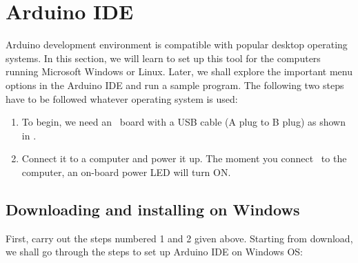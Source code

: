 
\section{Arduino IDE}\label{arduino-ide}
\label{sec:ard-start}
Arduino development environment is compatible with popular desktop
operating systems. In this section, we will learn to set up this tool
for the computers running Microsoft Windows or Linux. Later, we shall
explore the important menu options in the Arduino IDE and run a sample
program.  The following two steps have to be followed whatever operating
system is used:

\begin{enumerate}
      \item To begin, we need an \arduino\ board with a USB cable (A plug to
            B plug) as shown in .
      \item Connect it to a computer and power it up. The moment you connect \arduino\
            to the computer, an on-board power LED will turn ON.
\end{enumerate}

\subsection{Downloading and installing on Windows}
First, carry out the steps numbered 1 and 2 given above.
Starting from download, we shall go through the steps to set up
Arduino IDE on Windows OS:


